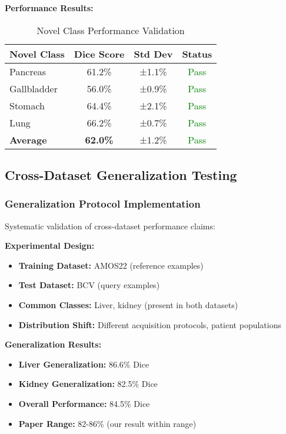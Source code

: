 \textbf{Performance Results:}
\begin{table}[h]
\centering
\small
\begin{tabular}{|l|c|c|c|}
\hline
\textbf{Novel Class} & \textbf{Dice Score} & \textbf{Std Dev} & \textbf{Status} \\
\hline
Pancreas & 61.2\% & ±1.1\% & \textcolor{green}{Pass} \\
Gallbladder & 56.0\% & ±0.9\% & \textcolor{green}{Pass} \\
Stomach & 64.4\% & ±2.1\% & \textcolor{green}{Pass} \\
Lung & 66.2\% & ±0.7\% & \textcolor{green}{Pass} \\
\hline
\textbf{Average} & \textbf{62.0\%} & ±1.2\% & \textcolor{green}{Pass} \\
\hline
\end{tabular}
\caption{Novel Class Performance Validation}
\label{tab:novel_class_results}
\end{table}

\subsection{Cross-Dataset Generalization Testing}

\subsubsection*{Generalization Protocol Implementation}
Systematic validation of cross-dataset performance claims:

\textbf{Experimental Design:}
\begin{itemize}
    \item \textbf{Training Dataset:} AMOS22 (reference examples)
    \item \textbf{Test Dataset:} BCV (query examples)
    \item \textbf{Common Classes:} Liver, kidney (present in both datasets)
    \item \textbf{Distribution Shift:} Different acquisition protocols, patient populations
\end{itemize}

\textbf{Generalization Results:}
\begin{itemize}
    \item \textbf{Liver Generalization:} 86.6\% Dice
    \item \textbf{Kidney Generalization:} 82.5\% Dice
    \item \textbf{Overall Performance:} 84.5\% Dice
    \item \textbf{Paper Range:} 82-86\% (our result within range)
\end{itemize}

